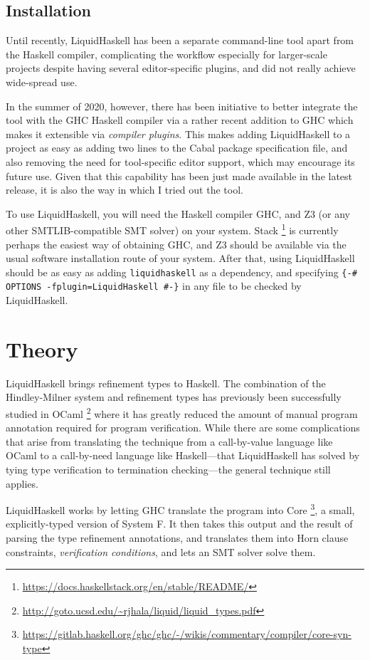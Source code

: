 \documentclass[11pt]{article}
\begin{document}
\subsection{Installation}
\label{sec:orgebd933f}

Until recently, LiquidHaskell has been a separate command-line tool apart from
the Haskell compiler, complicating the workflow especially for larger-scale
projects despite having several editor-specific plugins, and did not really
achieve wide-spread use.

In the summer of 2020, however, there has been initiative to better integrate
the tool with the GHC Haskell compiler via a rather recent addition to GHC which
makes it extensible via \emph{compiler plugins}. This makes adding LiquidHaskell to a
project as easy as adding two lines to the Cabal package specification file, and
also removing the need for tool-specific editor support, which may encourage its
future use. Given that this capability has been just made available in the
latest release, it is also the way in which I tried out the tool.

To use LiquidHaskell, you will need the Haskell compiler GHC, and Z3 (or any
other SMTLIB-compatible SMT solver) on your system. Stack \footnote{\url{https://docs.haskellstack.org/en/stable/README/}} is currently
perhaps the easiest way of obtaining GHC, and Z3 should be available via
the usual software installation route of your system. After that, using
LiquidHaskell should be as easy as adding \texttt{liquidhaskell} as a dependency, and
specifying \texttt{\{-\# OPTIONS -fplugin=LiquidHaskell \#-\}} in any file to be checked by
LiquidHaskell.

\section{Theory}
\label{sec:orgde20dfc}
LiquidHaskell brings refinement types to Haskell. The combination of the
Hindley-Milner system and refinement types has previously been successfully
studied in OCaml \footnote{\url{http://goto.ucsd.edu/\~rjhala/liquid/liquid\_types.pdf}} where it has greatly reduced the amount of manual
program annotation required for program verification. While there are some
complications that arise from translating the technique from a call-by-value
language like OCaml to a call-by-need language like Haskell---that LiquidHaskell
has solved by tying type verification to termination checking---the general
technique still applies.

LiquidHaskell works by letting GHC translate the program into Core \footnote{\url{https://gitlab.haskell.org/ghc/ghc/-/wikis/commentary/compiler/core-syn-type}}, a
small, explicitly-typed version of System F. It then takes this output and the
result of parsing the type refinement annotations, and translates them into Horn
clause constraints, \emph{verification conditions}, and lets an SMT solver solve them.
\end{document}
